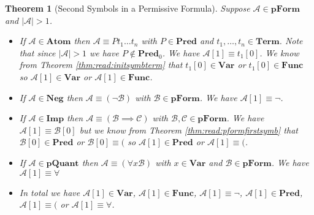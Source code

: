 \documentclass[12pt]{article}
\theoremstyle{break}
\theoremstyle{break}
\newtheorem{theorem}{Theorem}[section]
\theoremstyle{break}
\theoremstyle{break}
\theoremstyle{break}
\newtheorem{informal definition}[definition]{Informal Definition}
\newcommand{\mc}[1]{\mathcal{#1}}
\begin{document}
\begin{theorem}[Second Symbols in a Permissive Formula]
Suppose $\mc{A}\in\textbf{pForm}$ and $|\mc{A}|>1$.
\begin{itemize}
\item{If $\mc{A}\in\textbf{Atom}$ then $\mc{A}\equiv Pt_1\ldots t_n$ with $P\in\textbf{Pred}$ and $t_1,\ldots,t_n\in\textbf{Term}$.
Note that since $|\mc{A}|>1$ we have $P\not \in \textbf{Pred}_0$. We have $\mc{A}[1] \equiv t_1[0]$. We know from Theorem \ref{thm:read:initsymbterm} that $t_1[0] \in \textbf{Var}$ or $t_1[0] \in \textbf{Func}$ so $\mc{A}[1]\in \textbf{Var}$ or $\mc{A}[1] \in \textbf{Func}$.}
\item{If $\mc{A}\in\textbf{Neg}$ then $\mc{A} \equiv (\lnot \mc{B})$ with $\mc{B}\in\textbf{pForm}$. We have $\mc{A}[1] \equiv \lnot$.}
\item{If $\mc{A}\in\textbf{Imp}$ then $\mc{A}\equiv (\mc{B} \implies \mc{C})$ with $\mc{B}, \mc{C}\in\textbf{pForm}$. We have $\mc{A}[1] \equiv \mc{B}[0]$ but we know from Theorem \ref{thm:read:pformfirstsymb} that $\mc{B}[0] \in \textbf{Pred}$ or $\mc{B}[0] \equiv ($ so $\mc{A}[1]\in\textbf{Pred}$ or $\mc{A}[1] \equiv ($.}
\item{If $\mc{A} \in \textbf{pQuant}$ then $\mc{A} \equiv (\forall x \mc{B})$ with $x\in \textbf{Var}$ and $\mc{B}\in\textbf{pForm}$. We have $\mc{A}[1] \equiv \forall$}
\item{In total we have $\mc{A}[1] \in \textbf{Var}$, $\mc{A}[1]\in\textbf{Func}$, $\mc{A}[1] \equiv \lnot$, $\mc{A}[1]\in\textbf{Pred}$, $\mc{A}[1]\equiv ($ or $\mc{A}[1] \equiv \forall$.}
\end{itemize}
\end{theorem}
\end{document}
